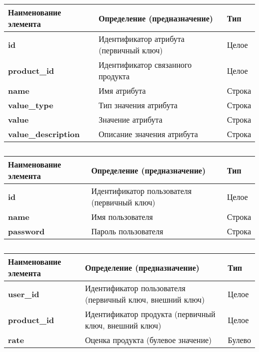 \begin{longtable}{|p{3.5cm}|p{5cm}|p{5cm}|}
	\caption{} \\
	\hline
	\textbf{Наименование элемента}
	& \textbf{Определение (предназначение)}
	& \textbf{Тип} \\ \hline
	\endhead
	\textbf{id} & Идентификатор атрибута (первичный ключ) & Целое \\ \hline
	\textbf{product\_id} & Идентификатор связанного продукта & Целое \\ \hline
	\textbf{name} & Имя атрибута & Строка \\ \hline
	\textbf{value\_type} & Тип значения атрибута & Строка \\ \hline
	\textbf{value} & Значение атрибута & Строка \\ \hline
	\textbf{value\_description} & Описание значения атрибута & Строка \\ \hline
\end{longtable}

\begin{longtable}{|p{3.5cm}|p{5cm}|p{5cm}|}
	\caption{} \\
	\hline
	\textbf{Наименование элемента}
	& \textbf{Определение (предназначение)}
	& \textbf{Тип} \\ \hline
	\endhead
	\textbf{id} & Идентификатор пользователя (первичный ключ) & Целое \\ \hline
	\textbf{name} & Имя пользователя & Строка \\ \hline
	\textbf{password} & Пароль пользователя & Строка \\ \hline
\end{longtable}

\begin{longtable}{|p{3.5cm}|p{5cm}|p{5cm}|}
	\caption{} \\
	\hline
	\textbf{Наименование элемента}
	& \textbf{Определение (предназначение)}
	& \textbf{Тип} \\ \hline
	\endhead
	\textbf{user\_id} & Идентификатор пользователя (первичный ключ, внешний ключ) & Целое \\ \hline
	\textbf{product\_id} & Идентификатор продукта (первичный ключ, внешний ключ) & Целое \\ \hline
	\textbf{rate} & Оценка продукта (булевое значение) & Булево \\ \hline
\end{longtable}



